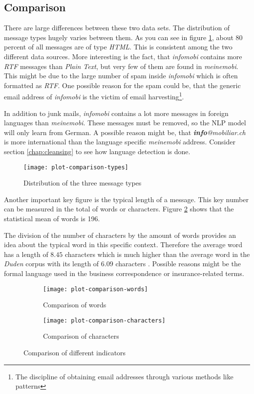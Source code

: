 \subsection{Comparison}

There are large differences between these two data sets. The distribution of message types hugely varies between them. As you can see in figure \ref{fig:plot-comparison-types}, about 80 percent of all messages are of type \emph{HTML}. This is consistent among the two different data sources. More interesting is the fact, that \emph{infomobi} contains more \emph{RTF} messages than \emph{Plain Text}, but very few of them are found in \emph{meinemobi}. This might be due to the large number of spam inside \emph{infomobi} which is often formatted as \emph{RTF}. One possible reason for the spam could be, that the generic email address of \emph{infomobi} is the victim of email harvesting\footnote{The discipline of obtaining email addresses through various methods like patterns}.

In addition to junk mails, \emph{infomobi} contains a lot more messages in foreign languages than \emph{meinemobi}. These messages must be removed, so the NLP model will only learn from German. A possible reason might be, that \emph{\textbf{info}@mobiliar.ch} is more international than the language specific \emph{meinemobi} address. Consider section \ref{chap:cleansing} to see how language detection is done.

\begin{figure}[!ht]
    \centering
    \texttt{[image: plot-comparison-types]}
    \caption{Distribution of the three message types}
    \label{fig:plot-comparison-types}
\end{figure}

Another important key figure is the typical length of a message. This key number can be measured in the total of words or characters. Figure \ref{fig:plot-comparison-words} shows that the statistical mean of words is 196.

The division of the number of characters by the amount of words provides an idea about the typical word in this specific context. Therefore the average word has a length of $8.45$ characters which is much higher than the average word in the \emph{\Gls{Duden}} corpus with its length of $6.09$ characters \cite{duden}. Possible reasons might be the formal language used in the business correspondence or insurance-related terms.

\begin{figure}[!ht]
    \begin{subfigure}{0.5\textwidth}
        \texttt{[image: plot-comparison-words]}
        \caption{Comparison of words}
        \label{fig:plot-comparison-words}
    \end{subfigure}
    \begin{subfigure}{0.5\textwidth}
        \texttt{[image: plot-comparison-characters]}
        \caption{Comparison of characters}
        \label{fig:plot-comparison-characters}
    \end{subfigure}
    \caption{Comparison of different indicators}
\end{figure}

